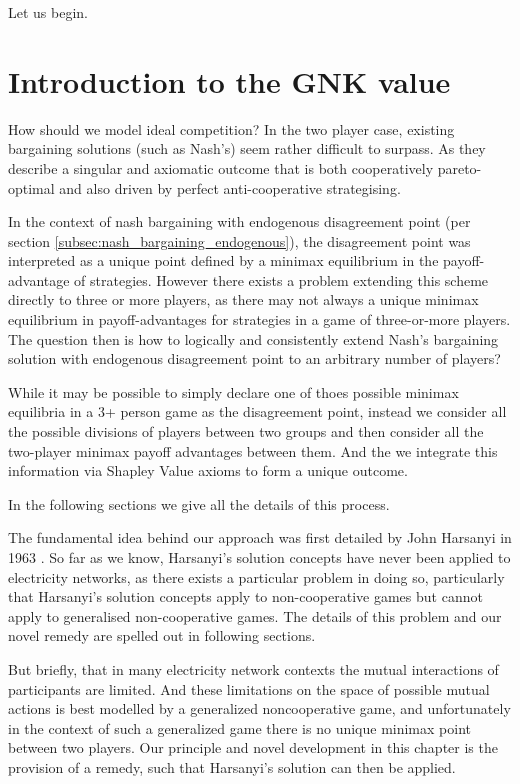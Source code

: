 Let us begin.

\section{Introduction to the GNK value}

How should we model ideal competition? In the two player case, existing bargaining solutions (such as Nash's) seem rather difficult to surpass. As they describe a singular and axiomatic outcome that is both cooperatively pareto-optimal and also driven by perfect anti-cooperative strategising.

In the context of nash bargaining with endogenous disagreement point (per section \ref{subsec:nash_bargaining_endogenous}), the disagreement point was interpreted as a unique point defined by a minimax equilibrium in the payoff-advantage of strategies.
However there exists a problem extending this scheme directly to three or more players, as there may not always a unique minimax equilibrium in payoff-advantages for strategies in a game of three-or-more players.
The question then is how to logically and consistently extend Nash's bargaining solution with endogenous disagreement point to an arbitrary number of players?

While it may be possible to simply declare one of thoes possible minimax equilibria in a 3+ person game as the disagreement point, 
instead we consider all the possible divisions of players between two groups and then consider all the two-player minimax payoff advantages between them. And the we integrate this information via Shapley Value axioms to form a unique outcome.

In the following sections we give all the details of this process.%

The fundamental idea behind our approach was first detailed by John Harsanyi in 1963 \cite{values3}.
So far as we know, Harsanyi's solution concepts have never been applied to electricity networks, as there exists a particular problem in doing so, particularly that Harsanyi's solution concepts apply to non-cooperative games but cannot apply to generalised non-cooperative games.
The details of this problem and our novel remedy are spelled out in following sections.

But briefly, that in many electricity network contexts the mutual interactions of participants are limited.
And these limitations on the space of possible mutual actions is best modelled by a generalized noncooperative game, and unfortunately in the context of such a generalized game there is no unique minimax point between two players.
Our principle and novel development in this chapter is the provision of a remedy, such that Harsanyi's solution can then be applied.

